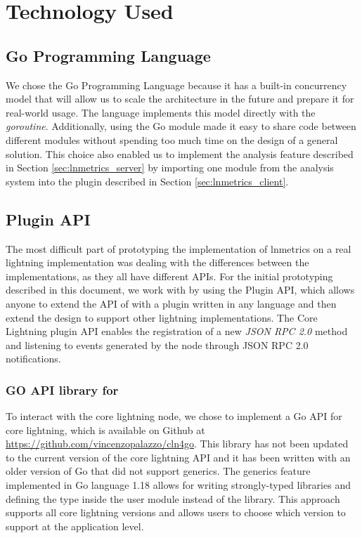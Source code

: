 \chapter{Technology Used}\label{chap:tech}

\section{Go Programming Language}

We chose the Go Programming Language because it has a built-in concurrency model that will allow 
us to scale the architecture in the future and prepare it for real-world usage. 
The language implements this model directly with the \emph{goroutine}. Additionally,
using the Go module made it easy to share code between different modules 
without spending too much time on the design of a general solution. 
This choice also enabled us to implement the analysis feature described in Section \ref{sec:lnmetrics_server} 
by importing one module from the analysis system into the plugin described in Section \ref{sec:lnmetrics_client}.

\section{{\CLN} Plugin API}

The most difficult part of prototyping the implementation of lnmetrics on a real 
lightning implementation was dealing with the differences between the implementations, 
as they all have different APIs. For the initial prototyping described in this document,
we work with {\CLN} by using the {\CLN} Plugin API, which allows 
anyone to extend the API of {\CLN} with a plugin written in any language and then
extend the design to support other lightning implementations.
The Core Lightning plugin API enables the registration 
of a new \emph{JSON RPC 2.0}\cite{jsonrpc} method and listening to 
events generated by the node through JSON RPC 2.0 notifications.

\subsection{GO API library for {\CLN}}
\label{sec:go-api}
To interact with the core lightning node, we chose to implement a Go API for core 
lightning, which is available on Github at \url{https://github.com/vincenzopalazzo/cln4go}. 
This library has not been updated to the current version of the core lightning 
API and it has been written with an older version of Go that did not support generics. 
The generics feature implemented in Go language 1.18 allows for writing 
strongly-typed libraries and defining the type inside the user module instead of the library. 
This approach supports all core lightning versions and allows users to choose 
which version to support at the application level.

